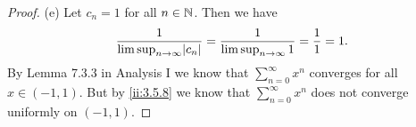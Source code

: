 \begin{proof}{(e)}
  Let \(c_n = 1\) for all \(n \in \mathbb{N}\).
  Then we have
  \[
    \dfrac{1}{\limsup_{n \to \infty} \abs{c_n}} = \dfrac{1}{\limsup_{n \to \infty} 1} = \dfrac{1}{1} = 1.
  \]
  By Lemma 7.3.3 in Analysis I we know that \(\sum_{n = 0}^\infty x^n\) converges for all \(x \in (-1, 1)\).
  But by \cref{ii:3.5.8} we know that \(\sum_{n = 0}^\infty x^n\) does not converge uniformly on \((-1, 1)\).
\end{proof}
